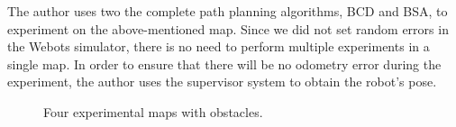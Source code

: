 \documentclass[conference]{IEEEtran}
\begin{document}
The author uses two the complete path planning algorithms, BCD and BSA, to experiment on the above-mentioned map. Since we did not set random errors in the Webots simulator, there is no need to perform multiple experiments in a single map. In order to ensure that there will be no odometry error during the experiment, the author uses the supervisor system to obtain the robot's pose. 

\begin{figure}[ht]
\centering
{}\hspace{-7mm}
\quad
{}\hspace{-7mm}
\quad
{}\hspace{-7mm}
\quad
{}

\caption{Four experimental maps with obstacles.}
\label{fig8}
\end{figure}
\end{document}
